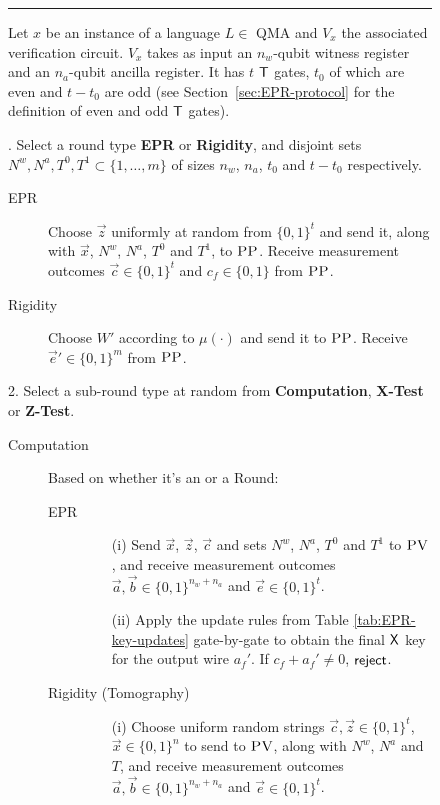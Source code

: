 \documentclass[11pt]{article}
\theoremstyle{remark}
\theoremstyle{definition}
\newcommand{\pv}{\textsc{PV}}
\newcommand{\pp}{\textsc{PP}}
\newcommand{\highlight}[1]{\uline{#1}}
\begin{document}
\begin{figure}[H]
\rule[1ex]{16.5cm}{0.5pt}
\vspace{-20pt}
\justify
Let $x$ be an instance of a language $L \in$ QMA and $V_x$ the associated verification circuit. $V_x$ takes as input  an $n_w$-qubit witness register and an $n_a$-qubit ancilla register. It has $t$ $\sf T$ gates, $t_0$ of which are even and $t-t_0$ are odd (see Section~\ref{sec:EPR-protocol} for the definition of even and odd $\sf T$ gates).

. Select a round type \textbf{EPR} or \textbf{Rigidity}, and disjoint sets
  $N^w,N^a, T^0,T^1\subset \{1,\ldots,m\}$ of sizes $n_w$, $n_a$,  $t_0$ and $t-t_0$ respectively. 
\begin{description}
\item[EPR] Choose $\vec{z}$ uniformly at random from $\{0,1\}^t$ and send it,
  along with $\vec{x}$, $N^w$, $N^a$, $T^0$ and $T^1$, to $\pp$. Receive measurement outcomes $\vec{c}\in\{0,1\}^t$ and $c_f\in\{0,1\}$ from $\pp$.
\item[Rigidity] Choose $W'$ according to $\mu(\cdot)$ and send it to $\pp$. Receive $\vec{e}'\in \{0,1\}^m$ from $\pp$. 
\end{description}
2. Select a sub-round type at random from \textbf{Computation}, \textbf{X-Test} or \textbf{Z-Test}. 
\begin{description}
\item[Computation] Based on whether it's an  or a  Round:
	\begin{description}
	\item[EPR]
		\begin{enumerate}
		\item[(i)] Send $\vec{x}$, $\vec{z}$, $\vec{c}$ and sets \highlight{$N^w$}, $N^a$, $T^0$
      and $T^1$ to $\pv$, and receive measurement outcomes $\vec{a},\vec{b}\in
        \{0,1\}^{n_w + n_a}$ and $\vec{e}\in\{0,1\}^t$.
		\item[(ii)] Apply the update rules from Table \ref{tab:EPR-key-updates} gate-by-gate to obtain the final $\sf X$ key for the output wire $a_f'$. If $c_f+a_f'\neq 0$, $\sf reject$. 
		\end{enumerate}
	\item[Rigidity (Tomography)]
		\begin{enumerate}
		\item[(i)] Choose uniform random strings $\vec{c},\vec{z}\in\{0,1\}^t$, $\vec{x} \in \{0,1\}^n$ 
      to send to $\pv$, along with \highlight{$N^w$}, $N^a$ and $T$, and receive measurement outcomes $\vec{a}, \vec{b}\in \{0,1\}^{n_w + n_a}$ and $\vec{e}\in\{0,1\}^t$. 

\end{enumerate}
\end{description}
\end{description}
\end{figure}
\end{document}
